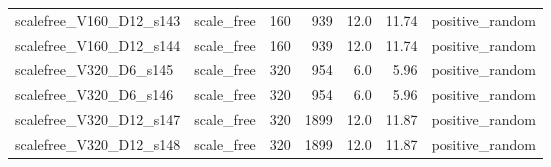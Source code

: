 \begin{table}[htbp]
\begin{tabular}{lrrrrrr}
scalefree\_V160\_D12\_s143 & scale\_free & 160 & 939 & 12.0 & 11.74 & positive\_random \\
scalefree\_V160\_D12\_s144 & scale\_free & 160 & 939 & 12.0 & 11.74 & positive\_random \\
scalefree\_V320\_D6\_s145 & scale\_free & 320 & 954 & 6.0 & 5.96 & positive\_random \\
scalefree\_V320\_D6\_s146 & scale\_free & 320 & 954 & 6.0 & 5.96 & positive\_random \\
scalefree\_V320\_D12\_s147 & scale\_free & 320 & 1899 & 12.0 & 11.87 & positive\_random \\
scalefree\_V320\_D12\_s148 & scale\_free & 320 & 1899 & 12.0 & 11.87 & positive\_random \\
\hline
\end{tabular}
\end{table}
